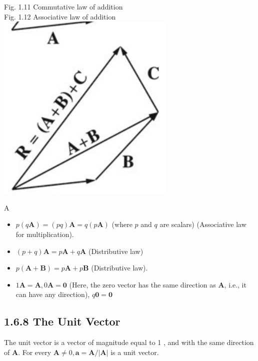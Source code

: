 \documentclass[10pt]{article}
\begin{document}
Fig. 1.11 Commutative law of addition\\
Fig. 1.12 Associative law of addition\\
\includegraphics[max width=\textwidth, center]{2024_09_13_db1f357d2aad0a03eb2eg-016(1)}

A

\begin{itemize}
  \item $p(q \mathbf{A})=(p q) \mathbf{A}=q(p \mathbf{A})$ (where $p$ and $q$ are scalars) (Associative law for multiplication).
  \item $(p+q) \mathbf{A}=p \mathbf{A}+q \mathbf{A}$ (Distributive law)
  \item $p(\mathbf{A}+\mathbf{B})=p \mathbf{A}+p \mathbf{B}$ (Distributive law).
  \item $1 \mathbf{A}=\mathbf{A}, 0 \mathbf{A}=\mathbf{0}$ (Here, the zero vector has the same direction as $\mathbf{A}$, i.e., it can have any direction), $q \mathbf{0}=\mathbf{0}$
\end{itemize}

\subsection*{1.6.8 The Unit Vector}
The unit vector is a vector of magnitude equal to 1 , and with the same direction of $\mathbf{A}$. For every $\mathbf{A} \neq 0, \mathbf{a}=\mathbf{A} /|\mathbf{A}|$ is a unit vector.
\end{document}
